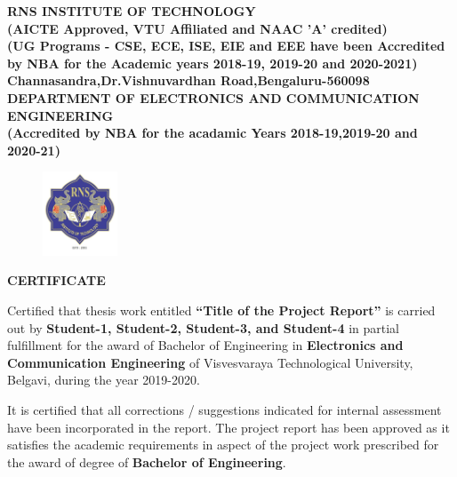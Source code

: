 %
\setlength{\toptafiddle}{1in}
\setlength{\bottafiddle}{1in}
\vspace*{-0.5in}
\enlargethispage{\bottafiddle}
\thispagestyle{empty}


\begin{center}
\small\textbf{	RNS INSTITUTE OF TECHNOLOGY\\
(AICTE Approved, VTU Affiliated and NAAC 'A' credited)\\
(UG Programs - CSE, ECE, ISE, EIE and EEE have been Accredited by NBA for the Academic years 2018-19, 2019-20 and 2020-2021)\\
Channasandra,Dr.Vishnuvardhan Road,Bengaluru-560098\\
\vspace{0.3cm}
DEPARTMENT OF ELECTRONICS AND COMMUNICATION ENGINEERING\\
(Accredited by NBA for the acadamic Years 2018-19,2019-20 and 2020-21)
}
\end{center}

\begin{center}
\begin{figure}[h]
\centering
\includegraphics[height=2.5cm]{images/rns1.jpg}
\end{figure}
\Large{\textbf{CERTIFICATE}}
\end{center}

Certified that thesis work entitled \textbf{``Title of the Project Report''} is carried out by \textbf{Student-1, Student-2, Student-3, and Student-4} in partial fulfillment for the award of Bachelor of Engineering in \textbf{\color{blue}Electronics and Communication Engineering} of Visvesvaraya Technological University, Belgavi, during the year 2019-2020. 


It is certified that all corrections / suggestions indicated for internal assessment have been incorporated in the report. The project report has been approved as it satisfies the academic requirements in aspect of the project work prescribed for the award of degree of \textbf{\color{blue}Bachelor of Engineering}.

